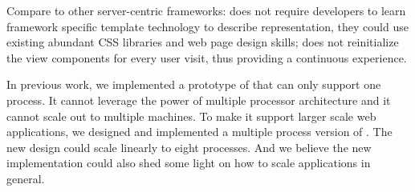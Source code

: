 Compare to other server-centric frameworks:
\cb{} does not require developers to learn framework specific template
technology to describe representation, 
they could use existing abundant CSS libraries and web page design skills;
\cb{} does not reinitialize the view components for every user visit,
thus providing a continuous experience.




In previous work, we implemented a prototype of \cb{} that can only support one process.
It cannot leverage the power of multiple processor architecture and
it cannot scale out to multiple machines.
To make it support larger scale web applications,
we designed and implemented a multiple process version of \cb{}.
The new design could scale linearly to eight processes.
And we believe
the new implementation could also shed some light on how to scale \nodejs{} applications in general.





\architectureoverview{}


